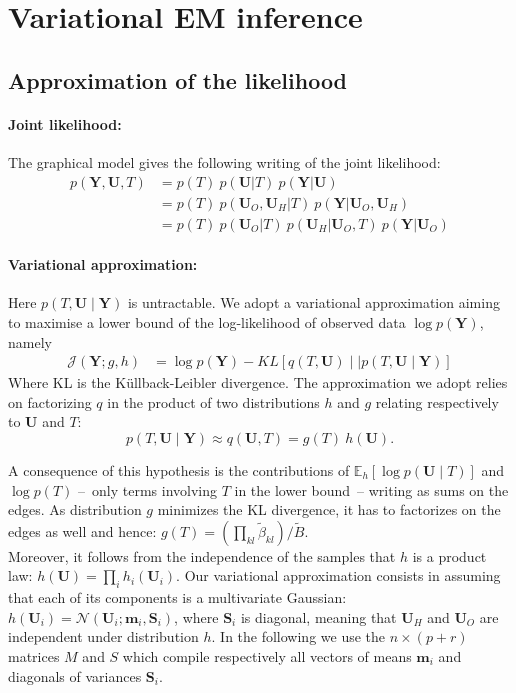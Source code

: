 \documentclass[11pt,a4paper]{article}
\newcommand{\Ybf}{\boldsymbol{Y}}
\newcommand{\Ubf}{\boldsymbol{U}}
\newcommand{\Sbf}{\boldsymbol{S}}
\newcommand{\mbf}{\boldsymbol{m}}
\newcommand\Ncal{\mathcal{N}}
\newcommand{\Esp}{\mathds{E}}
\begin{document}
 \section{Variational EM inference}
\subsection{Approximation of the likelihood}
\paragraph{Joint likelihood:}
The graphical model gives the following writing of the joint likelihood:
\begin{align*}
p(\Ybf,\Ubf,T)& = p(T) \: p(\Ubf|T) \: p(\Ybf|\Ubf) \\
&= p(T)\: p(\Ubf_O,\Ubf_H|T) \: p(\Ybf|\Ubf_O,\Ubf_H) \\
&= p(T) \: p(\Ubf_O|T) \: p(\Ubf_H | \Ubf_O,T)  \: p(\Ybf|\Ubf_O)
\end{align*} 


\paragraph{Variational approximation:}

Here $p(T,\Ubf \mid \Ybf)$ is untractable. We adopt a variational approximation aiming to maximise a lower bound of the log-likelihood of observed data $\log p(\Ybf)$, namely  
\begin{align*}
    \mathcal{J}(\Ybf; g,h)
    & = \log p(\Ybf) - KL\left[q(T,\Ubf) \mid\mid p(T,\Ubf \mid \Ybf)\right]
\end{align*}
Where KL is the Küllback-Leibler divergence. The approximation we adopt relies on factorizing $q$ in the product of two distributions $h$ and $g$ relating respectively to $\Ubf$  and $T$: 
$$p(T,\Ubf \mid\Ybf) \approx  q(\Ubf,T) = g(T)\:h(\Ubf).$$

 A consequence of this hypothesis is the contributions of   $\Esp_h[\log p(\Ubf\mid T)]$ and $\log p(T)$ --~only terms involving $T$ in the lower bound~-- writing as sums on the edges. As distribution   $g$ minimizes the KL divergence, it has to factorizes on the edges as well and hence:
$ g(T) = \left(\prod_{kl} \widetilde{\beta}_{kl} \right) / \widetilde{B}$. \\

Moreover, it follows from the independence of the samples that $h$ is a product law: $ h(\Ubf) = \prod_i h_i(\Ubf_i)$. Our variational approximation consists in assuming that each of its components is a multivariate Gaussian: $h(\Ubf_i) = \Ncal(\Ubf_i; \mbf_i, \Sbf_i)$, where $\Sbf_i$ is diagonal, meaning that $\Ubf_H$ and $\Ubf_O$ are independent under distribution $h$.  In the following we use the  $n\times (p+r)$ matrices $M$ and $S$ which compile respectively all vectors of means $\mbf_i$ and diagonals of variances $\Sbf_i$.
\end{document}

